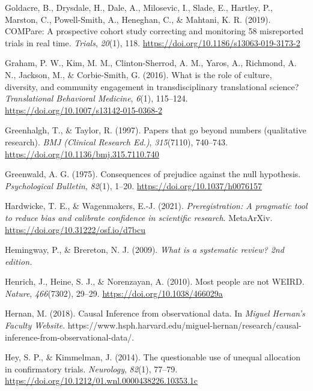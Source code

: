 \documentclass{krantz}
\newlength{\cslhangindent}
\newlength{\cslentryspacingunit} %
\newenvironment{CSLReferences}[2] %
{%
\setlength{\parindent}{0pt}
\ifodd #1
\let\oldpar\par
\def\par{\hangindent=\cslhangindent\oldpar}
\fi
\setlength{\parskip}{#2\cslentryspacingunit}
}%
{}
\begin{document}
\begin{CSLReferences}{1}{0}
\leavevmode{}%
Goldacre, B., Drysdale, H., Dale, A., Milosevic, I., Slade, E., Hartley, P., Marston, C., Powell-Smith, A., Heneghan, C., \& Mahtani, K. R. (2019). {COMPare}: A prospective cohort study correcting and monitoring 58 misreported trials in real time. \emph{Trials}, \emph{20}(1), 118. \url{https://doi.org/10.1186/s13063-019-3173-2}

\leavevmode{}%
Graham, P. W., Kim, M. M., Clinton-Sherrod, A. M., Yaros, A., Richmond, A. N., Jackson, M., \& Corbie-Smith, G. (2016). What is the role of culture, diversity, and community engagement in transdisciplinary translational science? \emph{Translational Behavioral Medicine}, \emph{6}(1), 115--124. \url{https://doi.org/10.1007/s13142-015-0368-2}

\leavevmode{}%
Greenhalgh, T., \& Taylor, R. (1997). Papers that go beyond numbers (qualitative research). \emph{BMJ (Clinical Research Ed.)}, \emph{315}(7110), 740--743. \url{https://doi.org/10.1136/bmj.315.7110.740}

\leavevmode{}%
Greenwald, A. G. (1975). Consequences of prejudice against the null hypothesis. \emph{Psychological Bulletin}, \emph{82}(1), 1--20. \url{https://doi.org/10.1037/h0076157}

\leavevmode{}%
Hardwicke, T. E., \& Wagenmakers, E.-J. (2021). \emph{Preregistration: {A} pragmatic tool to reduce bias and calibrate confidence in scientific research}. {MetaArXiv}. \url{https://doi.org/10.31222/osf.io/d7bcu}

\leavevmode{}%
Hemingway, P., \& Brereton, N. J. (2009). \emph{What is a systematic review? 2nd edition.}

\leavevmode{}%
Henrich, J., Heine, S. J., \& Norenzayan, A. (2010). Most people are not {WEIRD}. \emph{Nature}, \emph{466}(7302), 29--29. \url{https://doi.org/10.1038/466029a}

\leavevmode{}%
Hernan, M. (2018). Causal {Inference} from observational data. In \emph{Miguel Hernan's Faculty Website}. https://www.hsph.harvard.edu/miguel-hernan/research/causal-inference-from-observational-data/.

\leavevmode{}%
Hey, S. P., \& Kimmelman, J. (2014). The questionable use of unequal allocation in confirmatory trials. \emph{Neurology}, \emph{82}(1), 77--79. \url{https://doi.org/10.1212/01.wnl.0000438226.10353.1c}


\end{CSLReferences}
\end{document}
